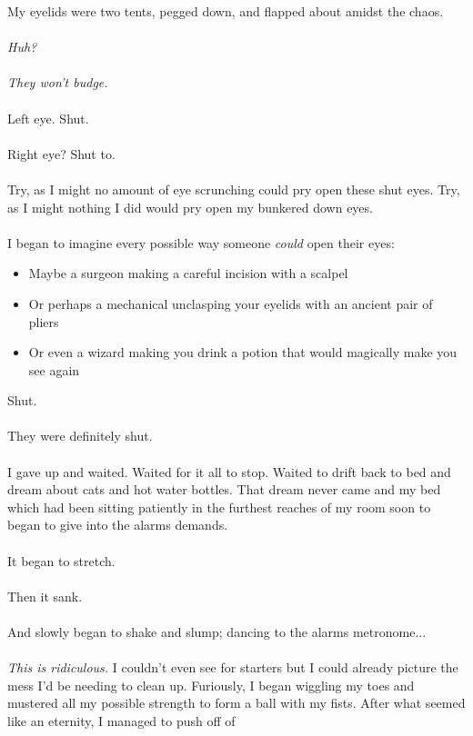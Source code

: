 \documentclass{book}
\begin{document}
{{	My eyelids were two tents, pegged down, and flapped about amidst the chaos.
	\\\\
	\textit{Huh?}
	\\\\
	\textit{They won't budge.}
	\\\\
	Left eye.
	Shut.\\\\
	Right eye?
	Shut to.\\\\
	Try, as I might no amount of eye scrunching could pry
	open these shut eyes.
	Try, as I might nothing I did would pry open my
    bunkered down eyes.\\\\
	\newpage
	I began to imagine every possible way someone \textit{could} open their eyes:
	\begin{itemize}
		\item Maybe a surgeon making a careful incision with a scalpel
		\item Or perhaps a mechanical unclasping your eyelids with an ancient pair of pliers
		\item Or even a wizard making you drink a potion that would magically make you see again
	\end{itemize}
	Shut.\\\\
	They were definitely shut.\\\\
	I gave up and waited. Waited for it all to stop. Waited to
	drift back to bed and dream about cats and hot water bottles.
	That dream never came and my bed which had been sitting patiently
	in the furthest reaches of my room soon to began to give
	into the alarms demands.\\\\
	It began to stretch.\\\\
	Then it sank.\\\\
	And slowly began to shake and slump; dancing to the alarms metronome...\\\\
	\textit{This is ridiculous.} I couldn't even see for starters but I
	could already picture the mess I'd be needing to clean up.
	Furiously, I began wiggling my toes and mustered all my possible
	strength to form a ball with my fists.
	After what seemed like an eternity,
	I managed to push off of
}}
\end{document}
